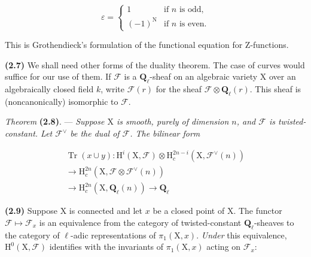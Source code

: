 \documentclass[10pt,leqno]{article}
\begin{document}
\[\varepsilon=\begin{cases}1&\text{if }n\text{ is odd},\\(-1)^{\mathrm N}&\text{if }n\text{ is even}.\end{cases}\]

\noindent This is Grothendieck’s formulation of the functional equation for \(\mathrm{Z}\)-functions.\par

\noindent \textbf{(2.7)} We shall need other forms of the duality theorem. The case of curves would suffice for our use of them. If \(\mathcal{F} \) is a \(\mathbf{Q}_{\ell }\)-sheaf on an algebraic variety \(\mathrm{X}\) over an algebraically closed field \(k\), write \(\mathcal{F} (r)\) for the sheaf \(\mathcal{F} \otimes \mathbf{Q}_{\ell }(r)\). This sheaf is (noncanonically) isomorphic to \(\mathcal{F} \).\par

\noindent \emph{Theorem} \textbf{(2.8)}. — {\itshape Suppose \(\mathrm{X}\) is smooth, purely of dimension \(n\), and \(\mathcal{F} \) is twisted-constant. Let \(\mathcal{F} ^{\vee }\) be the dual of \(\mathcal{F} \). The bilinear form}\par

\begin{equation*}\begin{gathered}\operatorname{Tr}(x\cup y) : \mathrm{H}^{i}(\mathrm{X},\mathcal{F} )\otimes \mathrm{H}_{c}^{2n- i}(\mathrm{X},\mathcal{F} ^{\vee }(n)) \\ \longrightarrow  \mathrm{H}_{c}^{2n}(\mathrm{X},\mathcal{F} \otimes \mathcal{F} ^{\vee }(n)) \\ \longrightarrow  \mathrm{H}_{c}^{2n}(\mathrm{X},\mathbf{Q}_{\ell }(n)) \longrightarrow  \mathbf{Q}_{\ell }\end{gathered}\end{equation*}

\par

\noindent \textbf{(2.9)} Suppose \(\mathrm{X}\) is connected and let \(x\) be a closed point of \(\mathrm{X}\). The functor \(\mathcal{F} \longmapsto \mathcal{F} _{x}\) is an equivalence from the category of twisted-constant \(\mathbf{Q}_{\ell }\)-sheaves to the category of \(\ell \)-adic representations of \(\pi _{1}(\mathrm{X},x)\). \emph{Under} this equivalence, \(\mathrm{H}^{0}(\mathrm{X},\mathcal{F} )\) identifies with the invariants of \(\pi _{1}(\mathrm{X},x)\) acting on \(\mathcal{F} _{x}\):\par
\end{document}
